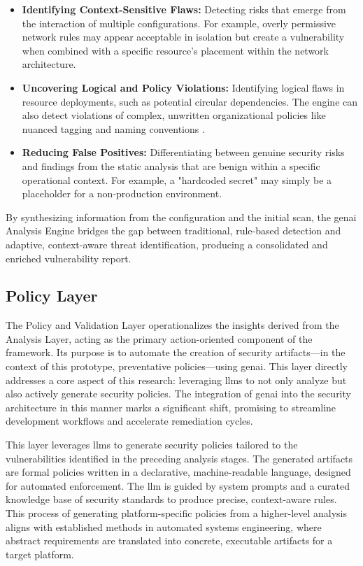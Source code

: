 \begin{itemize}
\item \textbf{Identifying Context-Sensitive Flaws:} Detecting risks that emerge from the interaction of multiple configurations. For example, overly permissive network rules may appear acceptable in isolation but create a vulnerability when combined with a specific resource's placement within the network architecture\cite{zhang_empirical_2024}.
\item \textbf{Uncovering Logical and Policy Violations:} Identifying logical flaws in resource deployments, such as potential circular dependencies. The engine can also detect violations of complex, unwritten organizational policies like nuanced tagging and naming conventions \cite{khanna_enhancing_2024}.
\item \textbf{Reducing False Positives:} Differentiating between genuine security risks and findings from the static analysis that are benign within a specific operational context. For example, a "hardcoded secret" may simply be a placeholder for a non-production environment.
\end{itemize}

By synthesizing information from the configuration and the initial scan, the \gls{genai} Analysis Engine bridges the gap between traditional, rule-based detection and adaptive, context-aware threat identification, producing a consolidated and enriched vulnerability report.

\subsection{Policy Layer}
\label{subsec:policy-layer}

The Policy and Validation Layer operationalizes the insights derived from the Analysis Layer, acting as the primary action-oriented component of the framework. Its purpose is to automate the creation of security artifacts—in the context of this prototype, preventative policies—using \gls{genai}. This layer directly addresses a core aspect of this research: leveraging \glspl{llm} to not only analyze but also actively generate security policies. The integration of \gls{genai} into the security architecture in this manner marks a significant shift, promising to streamline development workflows and accelerate remediation cycles.

This layer leverages \glspl{llm} to generate security policies tailored to the vulnerabilities identified in the preceding analysis stages. The generated artifacts are formal policies written in a declarative, machine-readable language, designed for automated enforcement. The \gls{llm} is guided by system prompts and a curated knowledge base of security standards to produce precise, context-aware rules. This process of generating platform-specific policies from a higher-level analysis aligns with established methods in automated systems engineering, where abstract requirements are translated into concrete, executable artifacts for a target platform\cite{fakih_llm4cve_2025}.

